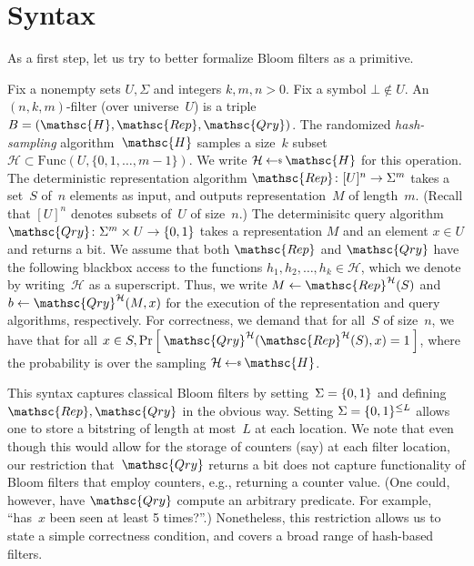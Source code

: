 \section{Syntax}
As a first step, let us try to better formalize Bloom filters as a primitive.

Fix a nonempty sets $U,\Sigma$ and integers $k,m,n>0$.  Fix a symbol $\bot \not\in U$.  An $(n,k,m)$-filter (over universe~$U$) is a triple  $B=(\mathsc{H},\mathsc{Rep},\mathsc{Qry})$.   
%
The randomized \emph{hash-sampling} algorithm~$\mathsc{H}$ samples a size~$k$ subset~$\mathcal{H} \subset \mathrm{Func}(U,\{0,1,\ldots,m-1\})$.  We write $\mathcal{H} \getsr \mathsc{H}$ for this operation.
%
The deterministic representation algorithm $\mathsc{Rep}\colon [U]^n \rightarrow \Sigma^m$ takes a set~$S$ of~$n$ elements as input, and outputs representation~$M$ of length~$m$.  (Recall that $[U]^n$ denotes subsets of~$U$ of size~$n$.)
%
The determinisitc query algorithm $\mathsc{Qry}\colon \Sigma^m \times U \rightarrow \bits$ takes a representation $M$ and an element $x \in U$ and returns a bit.  
%
We assume that both $\mathsc{Rep}$ and $\mathsc{Qry}$ have the following blackbox access to the functions $h_1,h_2,\ldots,h_k \in \mathcal{H}$, which we denote by writing~$\mathcal{H}$ as a superscript.   Thus, we write $M \gets \mathsc{Rep}^{\mathcal{H}}(S)$ and $b \gets \mathsc{Qry}^{\mathcal{H}}(M,x)$ for the execution of the representation and query algorithms, respectively.
%
For correctness, we demand that for all~$S$ of size~$n$, we have that for all $x \in S, \Prob{\mathsc{Qry}^{\mathcal{H}}(\mathsc{Rep}^{\mathcal{H}}(S),x)=1}$, where the probability is over the sampling $\mathcal{H}\getsr\mathsc{H}$.  

This syntax captures classical Bloom filters by setting~$\Sigma=\{0,1\}$ and defining $\mathsc{Rep},\mathsc{Qry}$ in the obvious way.  Setting $\Sigma=\{0,1\}^{\leq L}$ allows one to store a bitstring of length at most~$L$ at each location.   We note that even though this would allow for the storage of counters (say) at each filter location, our restriction that~$\mathsc{Qry}$ returns a bit does not capture functionality of Bloom filters that employ counters, e.g., returning a counter value. (One could, however, have $\mathsc{Qry}$ compute an arbitrary predicate.  For example, ``has~$x$ been seen at least 5 times?''.)  Nonetheless, this restriction allows us to state a simple correctness condition, and covers a broad range of hash-based filters.


